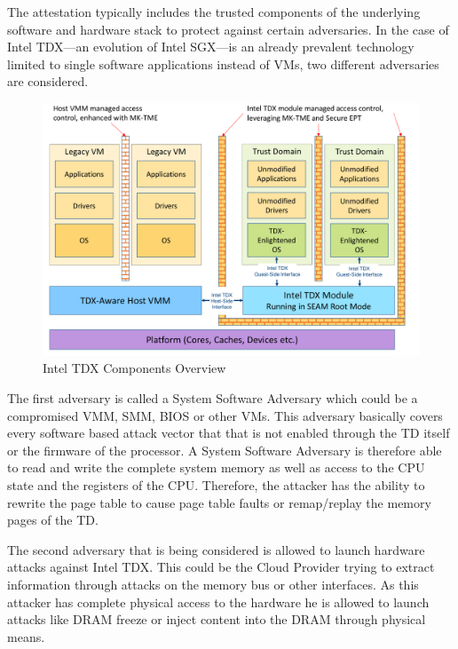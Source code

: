 \documentclass[sigplan,screen,nonacm]{acmart}
\begin{document}
The attestation typically includes the trusted components of the underlying software and hardware stack to protect against certain adversaries.
In the case of Intel TDX---an evolution of Intel SGX---is an already prevalent technology limited to single software applications instead of VMs, two different adversaries are considered.
\begin{figure}
  \centering
  \includegraphics[width=\linewidth]{pictures/TDX_Arch.png}
  \caption{Intel TDX Components Overview \cite{Intel-TDX-Module-Specs}}
  \label{fig:tdxcomponents}
\end{figure}

The first adversary is called a System Software Adversary which could be a compromised VMM, SMM, BIOS or other VMs.
This adversary basically covers every software based attack vector that that is not enabled through the TD itself or the firmware of the processor\cite[p. 8]{Intel-TDX-Whitepaper}.
A System Software Adversary is therefore able to read and write the complete system memory as well as access to the CPU state and the registers of the CPU.
Therefore, the attacker has the ability to rewrite the page table to cause page table faults or remap/replay the memory pages of the TD.

The second adversary that is being considered is allowed to launch hardware attacks against Intel TDX.
This could be the Cloud Provider trying to extract information through attacks on the memory bus or other interfaces.
As this attacker has complete physical access to the hardware he is allowed to launch attacks like DRAM freeze or inject content into the DRAM through physical means\cite[p. 8]{Intel-TDX-Whitepaper}.
\end{document}
